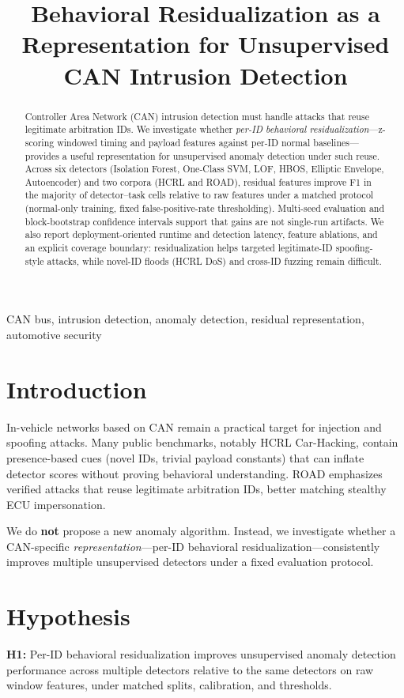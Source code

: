 \documentclass[conference]{IEEEtran}
\title{Behavioral Residualization as a Representation for Unsupervised CAN Intrusion Detection}
\author{
\IEEEauthorblockN{Anonymous Authors}
\IEEEauthorblockA{Prepared for arXiv submission}
}
\begin{document}
\maketitle

\begin{abstract}
Controller Area Network (CAN) intrusion detection must handle attacks that reuse legitimate arbitration IDs.
We investigate whether \emph{per-ID behavioral residualization}---z-scoring windowed timing and payload features against per-ID normal baselines---provides a useful representation for unsupervised anomaly detection under such reuse.
Across six detectors (Isolation Forest, One-Class SVM, LOF, HBOS, Elliptic Envelope, Autoencoder) and two corpora (HCRL and ROAD), residual features improve F1 in the majority of detector--task cells relative to raw features under a matched protocol (normal-only training, fixed false-positive-rate thresholding).
Multi-seed evaluation and block-bootstrap confidence intervals support that gains are not single-run artifacts.
We also report deployment-oriented runtime and detection latency, feature ablations, and an explicit coverage boundary: residualization helps targeted legitimate-ID spoofing-style attacks, while novel-ID floods (HCRL DoS) and cross-ID fuzzing remain difficult.
\end{abstract}

\begin{IEEEkeywords}
CAN bus, intrusion detection, anomaly detection, residual representation, automotive security
\end{IEEEkeywords}

\section{Introduction}
In-vehicle networks based on CAN remain a practical target for injection and spoofing attacks.
Many public benchmarks, notably HCRL Car-Hacking, contain presence-based cues (novel IDs, trivial payload constants) that can inflate detector scores without proving behavioral understanding.
ROAD emphasizes verified attacks that reuse legitimate arbitration IDs, better matching stealthy ECU impersonation.

We do \textbf{not} propose a new anomaly algorithm.
Instead, we investigate whether a CAN-specific \emph{representation}---per-ID behavioral residualization---consistently improves multiple unsupervised detectors under a fixed evaluation protocol.

\section{Hypothesis}
\textbf{H1:} Per-ID behavioral residualization improves unsupervised anomaly detection performance across multiple detectors relative to the same detectors on raw window features, under matched splits, calibration, and thresholds.
\end{document}
